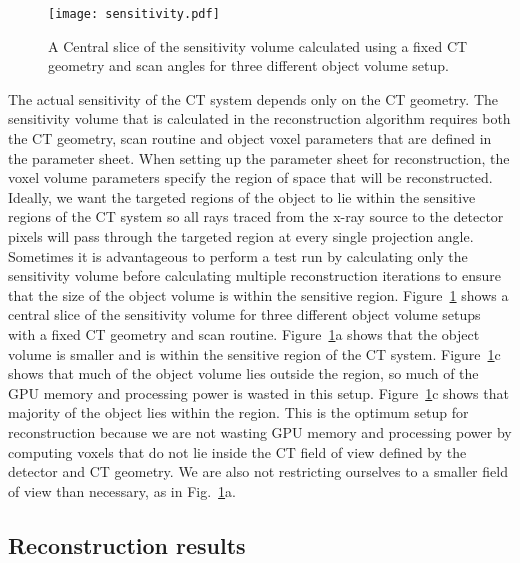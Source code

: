 \begin{figure}
\centering
\texttt{[image: sensitivity.pdf]}
\caption{A Central slice of the sensitivity volume calculated using a fixed CT geometry and scan angles for three different object volume setup.}
\label{fig:sensitivityslices}
\end{figure}

The actual sensitivity of the CT system depends only on the CT geometry.  The sensitivity volume that is calculated in the reconstruction algorithm requires both the CT geometry, scan routine and object voxel parameters that are defined in the parameter sheet.  When setting up the parameter sheet for reconstruction, the voxel volume parameters specify the region of space that will be reconstructed.  Ideally, we want the targeted regions of the object to lie within the sensitive regions of the CT system so all rays traced from the x-ray source to the detector pixels will pass through the targeted region at every single projection angle.  Sometimes it is advantageous to perform a test run by calculating only the sensitivity volume before calculating multiple reconstruction iterations to ensure that the size of the object volume is within the sensitive region.  Figure~\ref{fig:sensitivityslices} shows a central slice of the sensitivity volume for three different object volume setups with a fixed CT geometry and scan routine.  Figure~\ref{fig:sensitivityslices}a shows that the object volume is smaller and is within the sensitive region of the CT system.  Figure~\ref{fig:sensitivityslices}c shows that much of the object volume lies outside the region, so much of the GPU memory and processing power is wasted in this setup. Figure~\ref{fig:sensitivityslices}c shows that majority of the object lies within the region.  This is the optimum setup for reconstruction because we are not wasting GPU memory and processing power by computing voxels that do not lie inside the CT field of view defined by the detector and CT geometry.  We are also not restricting ourselves to a smaller field of view than necessary, as in Fig.~\ref{fig:sensitivityslices}a.

\subsection{Reconstruction results}

